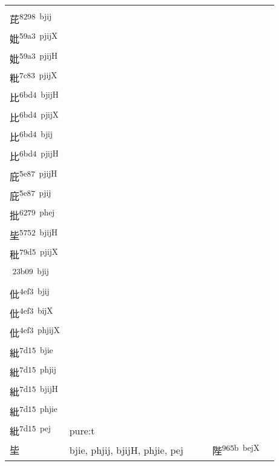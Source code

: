 \documentclass[14pt,a4paper]{scrartcl}
\begin{document}
\begin{longtable}[c]{@{}llllll@{}}
\begin{minipage}[t]{0.14\columnwidth}
\strut\end{minipage} &
\begin{minipage}[t]{0.14\columnwidth}\raggedright\strut
枇\textsuperscript{6787~pjijX}\\
芘\textsuperscript{8298~bjij}\\
妣\textsuperscript{59a3~pjijX}\\
妣\textsuperscript{59a3~pjijH}\\
粃\textsuperscript{7c83~pjijX}\\
比\textsuperscript{6bd4~bjijH}\\
比\textsuperscript{6bd4~pjijX}\\
比\textsuperscript{6bd4~bjij}\\
比\textsuperscript{6bd4~pjijH}\\
庇\textsuperscript{5e87~pjijH}\\
庇\textsuperscript{5e87~pjij}\\
批\textsuperscript{6279~phej}\\
坒\textsuperscript{5752~bjijH}\\
秕\textsuperscript{79d5~pjijX}\\
𣬉\textsuperscript{23b09~bjij}\\
仳\textsuperscript{4ef3~bjij}\\
仳\textsuperscript{4ef3~bijX}\\
仳\textsuperscript{4ef3~phjijX}\\
紕\textsuperscript{7d15~bjie}\\
紕\textsuperscript{7d15~phjij}\\
紕\textsuperscript{7d15~bjijH}\\
紕\textsuperscript{7d15~phjie}\\
紕\textsuperscript{7d15~pej}
\strut\end{minipage} &
\begin{minipage}[t]{0.14\columnwidth}\raggedright\strut
pure:t
\strut\end{minipage}\tabularnewline
\begin{minipage}[t]{0.14\columnwidth}\raggedright\strut
坒
\strut\end{minipage} &
\begin{minipage}[t]{0.14\columnwidth}\raggedright\strut
bjie, phjij, bjijH, phjie, pej
\strut\end{minipage} &
\begin{minipage}[t]{0.14\columnwidth}\raggedright\strut
\strut\end{minipage} &
\begin{minipage}[t]{0.14\columnwidth}\raggedright\strut
\strut\end{minipage} &
\begin{minipage}[t]{0.14\columnwidth}\raggedright\strut
陛\textsuperscript{965b~bejX}
\strut\end{minipage} &
\begin{minipage}[t]{0.14\columnwidth}\raggedright\strut
\strut\end{minipage}\tabularnewline
\bottomrule
\end{longtable}
\end{document}
